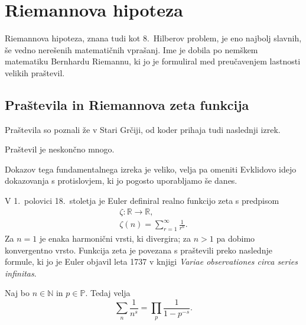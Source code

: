 \documentclass[mat1]{fmfdelo}
\begin{document}
\section{Riemannova hipoteza}

Riemannova hipoteza, znana tudi kot 8.~Hilberov problem, je eno najbolj slavnih, še vedno nerešenih matematičnih vprašanj. Ime je dobila po nemškem matematiku Bernhardu Riemannu, ki jo je formuliral med preučavenjem lastnosti velikih praštevil.
%
\subsection{Praštevila in Riemannova zeta funkcija}

Praštevila so poznali že v Stari Grčiji, od koder prihaja tudi naslednji izrek.
\begin{izrek}[Evklid]
Praštevil je neskončno mnogo.
\end{izrek}

Dokazov tega fundamentalnega izreka je veliko, velja pa omeniti Evklidovo idejo dokazovanja s protislovjem, ki jo pogosto uporabljamo še danes.

V 1.~polovici 18.~stoletja je Euler definiral realno funkcijo zeta s predpisom
\begin{align}
\zeta \colon \mathbb{R} \rightarrow \mathbb{R}, \nonumber \\
\zeta(n) = \sum_{r=1}^{\infty}\frac{1}{r^n}.
\end{align}
Za $n=1$ je enaka harmonični vrsti, ki divergira; za $n>1$ pa dobimo konvergentno vrsto. Funkcija zeta je povezana s praštevili preko naslednje formule, ki jo je Euler objavil leta 1737 v knjigi \emph{Variae observationes circa series infinitas}.

\begin{izrek}
\label{izr:EulProdukt}
Naj bo $n\in\mathbb{N}$ in $p\in\mathbb{P}$. Tedaj velja
\begin{equation}
\sum_{n}\frac{1}{n^s} = \prod_{p}\frac{1}{1-p^{-s}}.
\end{equation}
\end{izrek}
\end{document}
